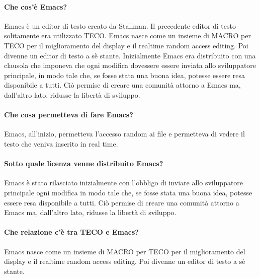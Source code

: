 \documentclass[a4paper]{article}
\begin{document}
		\paragraph{Che cos'è Emacs?} %
		Emacs è un editor di testo creato da Stallman. Il precedente editor di testo solitamente era utilizzato TECO. Emacs nasce come un insieme di MACRO per TECO per il miglioramento del display e il realtime random access editing. Poi divenne un editor di testo a sè stante. Inizialmente Emacs era distribuito con una clausola che imponeva che ogni modifica dovessere essere inviata allo sviluppatore principale, in modo tale che, se fosse stata una buona idea, potesse essere resa disponibile a tutti. Ciò permise di creare una comunità attorno a Emacs ma, dall'altro lato, ridusse la libertà di sviluppo.

		\paragraph{Che cosa permetteva di fare Emacs?}
		Emacs, all'inizio, permetteva l'accesso random ai file e permetteva di vedere il testo che veniva inserito in real time.

		\paragraph{Sotto quale licenza venne distribuito Emacs?}
		Emacs è stato rilasciato inizialmente con l'obbligo di inviare allo sviluppatore principale ogni modifica in modo tale che, se fosse stata una buona idea, potesse essere resa disponibile a tutti. Ciò permise di creare una comunità attorno a Emacs ma, dall'altro lato, ridusse la libertà di sviluppo.

		\paragraph{Che relazione c'è tra TECO e Emacs?}
		Emacs nasce come un insieme di MACRO per TECO per il miglioramento del display e il realtime random access editing. Poi divenne un editor di testo a sè stante.
		
\end{document}
